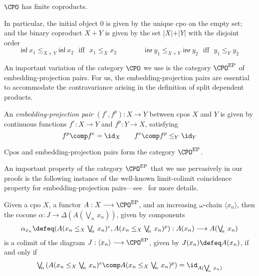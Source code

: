 \begin{proposition}
\label{prop:CPOhasfinitecoproducts}
$\CPO$ has finite coproducts. 
\end{proposition}

In particular, the initial object $0$ is given by the unique cpo on the empty set; and the binary coproduct $X + Y$ is given by the set $\vert X \vert + \vert Y \vert$ with the disjoint order
\[
\mathsf{inl}~x_1 \leq_{X + Y} \mathsf{inl}~x_2 \text{~~iff~~} x_1 \leq_X x_2
\qquad
\qquad
\mathsf{inr}~y_1 \leq_{X + Y} \mathsf{inr}~y_2 \text{~~iff~~} y_1 \leq_Y y_2
\]


An important variation of the category $\CPO$ we use is the category $\CPO^{\text{EP}}$ of embedding-projection pairs. For us, the embedding-projection pairs are essential to accommodate the contravariance arising in the definition of split dependent products.

\begin{definition}
An \emph{embedding-projection pair} $(f^e,f^p) : X \longrightarrow Y$ between cpos $X$ and $Y$ is given by continuous functions $f^e : X \longrightarrow Y$ and $f^p : Y \longrightarrow X$, satisfying
\[
f^p \comp f^e = \id_X
\qquad
f^e \comp f^p \leq_Y \id_Y
\]
\end{definition}

\begin{proposition}
Cpos and embedding-projection pairs form the category $\CPO^{\text{EP}}$.
\end{proposition}

An important property of the category $\CPO^{\text{EP}}$ that we use pervasively in our proofs is the following instance of the well-known limit-colimit coincidence property for embed\-ding-projection pairs---see~\cite[Theorem~2]{Smyth:RecDomEqs} for more details.

\begin{proposition}
\label{prop:limitcolimitcoincidenceforcfam}
Given a cpo $X$, a functor $A : X \longrightarrow \CPO^{\text{EP}}$, and an increasing $\omega$-chain $\langle x_n \rangle$, then the cocone $\alpha : J \longrightarrow \Delta(A(\bigvee_{\!\!n}\, x_n))$, given by components 
\[
\begin{array}{c}
\alpha_{x_n} \defeq (A(x_n \leq_X \bigvee_{\!\!n}\, x_n)^e , A(x_n \leq_X \bigvee_{\!\!n}\, x_n)^p) : A(x_n) \longrightarrow A(\bigvee_{\!\!n}\, x_n)
\end{array}
\]
is a colimit of the diagram $J : \langle x_n \rangle \longrightarrow \CPO^{\text{EP}}$, given by $J(x_n) \defeq A(x_n)$, if and only if 
\[
\begin{array}{c}
\bigvee_{\!\!n}\, (A(x_n \leq_X \bigvee_{\!\!n}\, x_n)^e \comp A(x_n \leq_X \bigvee_{\!\!n}\, x_n)^p) = \id_{A(\bigvee_{\!\!n}\, x_n)} 
\end{array}
\]
\end{proposition}



